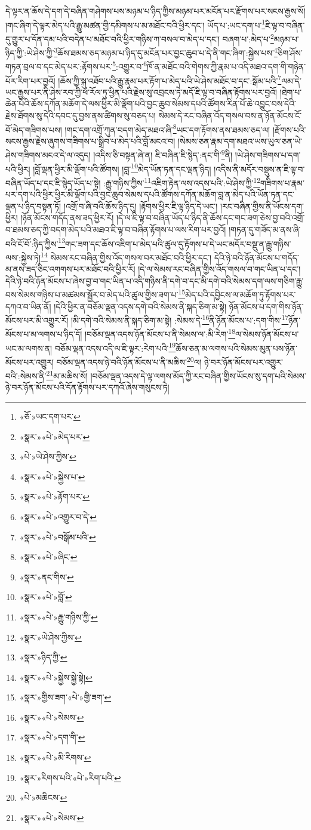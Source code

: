 དེ་ལྟར་ན་ཆོས་དེ་དག་དེ་བཞིན་གཤེགས་པས་མཉམ་པ་ཉིད་ཀྱིས་མཉམ་པར་མངོན་པར་རྫོགས་པར་སངས་རྒྱས་སོ། །གང་ཞིག་དེ་ལྟར་མེད་པའི་རྒྱུ་མཚན་གྱི་དམིགས་པ་མ་མཐོང་བའི་ཕྱིར་དང་། ཡོད་པ་:ཡང་དག་པ་\footnote{«ཅོ་»ཡང་དག་པར་}ཇི་ལྟ་བ་བཞིན་དུ་གྱུར་པ་དོན་དམ་པའི་བདེན་པ་མཐོང་བའི་ཕྱིར་གཉིས་ཀ་བསལ་བ་མེད་པ་དང་། བཞག་པ་:མེད་པ་\footnote{«སྣར་»«པེ་»མེད་པར་}མཉམ་པ་ཉིད་ཀྱི་:ཡེ་ཤེས་ཀྱི་\footnote{«པེ་»ཡེ་ཤེས་ཀྱིས་}ཆོས་ཐམས་ཅད་མཉམ་པ་ཉིད་དུ་མངོན་པར་བྱང་ཆུབ་པ་དེ་ནི་གང་ཞིག་:སྐྱེས་པས་\footnote{«སྣར་»«པེ་»སྐྱེས་པ་}ཅིག་ཤོས་གཏན་བྲལ་བ་དང་མེད་པར་:རྟོགས་པར་\footnote{«སྣར་»«པེ་»རྟོག་པར་}:འགྱུར་བ་\footnote{«སྣར་»«པེ་»འགྱུར་བ་དེ་}ཁོ་ན་མཐོང་བའི་གེགས་ཀྱི་རྣམ་པ་འདི་མཐའ་དག་གི་གཉེན་པོར་རིག་པར་བྱའོ། །ཆོས་ཀྱི་སྐུ་འཐོབ་པའི་རྒྱུ་རྣམ་པར་རྟོག་པ་མེད་པའི་ཡེ་ཤེས་མཐོང་བ་དང་:སྒོམ་པའི་\footnote{«སྣར་»«པེ་»བསྒོམ་པའི་}ལམ་དེ་ཡང་རྒྱས་པར་ནི་ཤེས་རབ་ཀྱི་ཕ་རོལ་ཏུ་ཕྱིན་པའི་རྗེས་སུ་འབྲངས་ཏེ་མདོ་ཇི་ལྟ་བ་བཞིན་རྟོགས་པར་བྱའོ། །ཐེག་པ་ཆེན་པོའི་ཆོས་དཀོན་མཆོག་དེ་ལས་ཕྱིར་མི་ལྡོག་པའི་བྱང་ཆུབ་སེམས་དཔའི་ཚོགས་རིན་པོ་ཆེ་འབྱུང་བས་དེའི་རྗེས་ཐོགས་སུ་དེའི་དབང་དུ་བྱས་ནས་ཚིགས་སུ་བཅད་པ། སེམས་དེ་རང་བཞིན་འོད་གསལ་བས་ན་ཉོན་མོངས་ངོ་བོ་མེད་གཟིགས་པས། །གང་དག་འགྲོ་ཀུན་བདག་མེད་མཐའ་ཞི་\footnote{«སྣར་»«པེ་»ཞིང་}ཡང་དག་རྟོགས་ནས་ཐམས་ཅད་ལ། །རྫོགས་པའི་སངས་རྒྱས་རྗེས་ཞུགས་གཟིགས་པ་སྒྲིབ་པ་མེད་པའི་བློ་མངའ་བ། །སེམས་ཅན་རྣམ་དག་མཐའ་ཡས་ཡུལ་ཅན་ཡེ་ཤེས་གཟིགས་མངའ་དེ་ལ་འདུད། །འདིས་ཅི་བསྟན་ཞེ་ན། ཇི་བཞིན་ཇི་སྙེད་:ནང་གི་\footnote{«སྣར་»ནང་གིས་}ནི། །ཡེ་ཤེས་གཟིགས་པ་དག་པའི་ཕྱིར། །བློ་ལྡན་ཕྱིར་མི་ལྡོག་པའི་ཚོགས། །བླ་\footnote{«སྣར་»«པེ་»བློ་}མེད་ཡོན་ཏན་དང་ལྡན་ཉིད། །འདིས་ནི་མདོར་བསྡུས་ན་ཇི་ལྟ་བ་བཞིན་ཡོད་པ་དང་ཇི་སྙེད་ཡོད་པ་སྟེ། :རྒྱུ་གཉིས་ཀྱིས་\footnote{«སྣར་»«པེ་»རྒྱུ་གཉིས་ཀྱི་}འཇིག་རྟེན་ལས་འདས་པའི་:ཡེ་ཤེས་ཀྱི་\footnote{«སྣར་»ཡེ་ཤེས་ཀྱིས་}གཟིགས་པ་རྣམ་པར་དག་པའི་ཕྱིར་ཕྱིར་མི་ལྡོག་པའི་བྱང་ཆུབ་སེམས་དཔའི་ཚོགས་དཀོན་མཆོག་བླ་ན་མེད་པའི་ཡོན་ཏན་དང་ལྡན་པ་ཉིད་བསྟན་ཏོ། །འགྲོ་བ་ཞི་བའི་ཆོས་ཉིད་དུ། །རྟོགས་ཕྱིར་ཇི་ལྟ་ཉིད་དེ་ཡང་། །རང་བཞིན་གྱིས་ནི་ཡོངས་དག་ཕྱིར། །ཉོན་མོངས་གདོད་ནས་ཟད་ཕྱིར་རོ། །དེ་ལ་ཇི་ལྟ་བ་བཞིན་ཡོད་པ་ཉིད་ནི་ཆོས་དང་གང་ཟག་ཅེས་བྱ་བའི་འགྲོ་བ་ཐམས་ཅད་ཀྱི་བདག་མེད་པའི་མཐའ་ཇི་ལྟ་བ་བཞིན་རྟོགས་པ་ལས་རིག་པར་བྱའོ། །གཏན་དུ་གཟོད་མ་ནས་ཞི་བའི་ངོ་བོ་:ཉིད་ཀྱིས་\footnote{«སྣར་»ཉིད་ཀྱི་}གང་ཟག་དང་ཆོས་འཇིག་པ་མེད་པའི་ཚུལ་དུ་རྟོགས་པ་དེ་ཡང་མདོར་བསྡུ་ན་རྒྱུ་གཉིས་ལས་:སྐྱེས་ཏེ།\footnote{«སྣར་»«པེ་»སྐྱེས་སྐྱེ་སྟེ།} སེམས་རང་བཞིན་གྱིས་འོད་གསལ་བར་མཐོང་བའི་ཕྱིར་དང་། དེའི་ཉེ་བའི་ཉོན་མོངས་པ་གདོད་མ་ནས་ཟད་ཅིང་འགགས་པར་མཐོང་བའི་ཕྱིར་རོ། །དེ་ལ་སེམས་རང་བཞིན་གྱིས་འོད་གསལ་བ་གང་ཡིན་པ་དང་། དེའི་ཉེ་བའི་ཉོན་མོངས་པ་ཞེས་བྱ་བ་གང་ཡིན་པ་འདི་གཉིས་ནི་དགེ་བ་དང་མི་དགེ་བའི་སེམས་དག་ལས་གཅིག་རྒྱུ་བས་སེམས་གཉིས་པ་མཚམས་སྦྱོར་བ་མེད་པའི་ཚུལ་གྱིས་ཟག་པ་\footnote{«སྣར་»གྱིས་ཟག་«པེ་»གྱི་ཟག་}མེད་པའི་དབྱིངས་ལ་མཆོག་ཏུ་རྟོགས་པར་དཀའ་བ་ཡིན་ནོ། །དེའི་ཕྱིར་ན་བཅོམ་ལྡན་འདས་དགེ་བའི་སེམས་ནི་སྐད་ཅིག་མ་སྟེ། ཉོན་མོངས་པ་དག་གིས་ཉོན་མོངས་པར་མི་འགྱུར་རོ། །མི་དགེ་བའི་སེམས་ནི་སྐད་ཅིག་མ་སྟེ། :སེམས་དེ་\footnote{«སྣར་»«པེ་»སེམས་}ནི་ཉོན་མོངས་པ་:དག་གིས་\footnote{«སྣར་»«པེ་»དག་གི་}ཉོན་མོངས་པ་མ་ལགས་པ་ཉིད་དོ། །བཅོམ་ལྡན་འདས་ཉོན་མོངས་པ་ནི་སེམས་ལ་:མི་རེག་\footnote{«སྣར་»«པེ་»མི་རིགས་}ལ་སེམས་ཉོན་མོངས་པ་ཡང་མ་ལགས་ན། བཅོམ་ལྡན་འདས་འདི་ལ་ཇི་ལྟར་:རེག་པའི་\footnote{«སྣར་»རིགས་པའི་«པེ་»རིག་པའི་}ཆོས་ཅན་མ་ལགས་པའི་སེམས་མུན་པས་ཉོན་མོངས་པར་འགྱུར། བཅོམ་ལྡན་འདས་ཉེ་བའི་ཉོན་མོངས་པ་ནི་མཆིས་\footnote{«པེ་»མཆིངས་}ལ། ཉེ་བར་ཉོན་མོངས་པར་འགྱུར་བའི་:སེམས་ནི་\footnote{«སྣར་»«པེ་»སེམས་}མ་མཆིས་སོ། །བཅོམ་ལྡན་འདས་དེ་ལྟ་ལགས་མོད་ཀྱི་རང་བཞིན་གྱིས་ཡོངས་སུ་དག་པའི་སེམས་ཉེ་བར་ཉོན་མོངས་པའི་དོན་རྟོགས་པར་དཀའོ་ཞེས་གསུངས་ཏེ། 